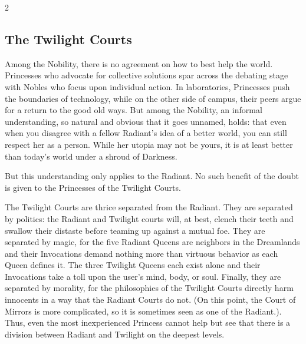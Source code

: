 \begin{multicols}{2}

\subsection*{The Twilight Courts}

Among the Nobility, there is no agreement on how to best help the world. Princesses who advocate for collective solutions spar across the debating stage with Nobles who focus upon individual action. In laboratories, Princesses push the boundaries of technology, while on the other side of campus, their peers argue for a return to the good old ways. But among the Nobility, an informal understanding, so natural and obvious that it goes unnamed, holds: that even when you disagree with a fellow Radiant's idea of a better world, you can still respect her as a person. While her utopia may not be yours, it is at least better than today's world under a shroud of Darkness. 

But this understanding only applies to the Radiant. No such benefit of the doubt is given to the Princesses of the Twilight Courts. 

The Twilight Courts are thrice separated from the Radiant. They are separated by politics: the Radiant and Twilight courts will, at best, clench their teeth and swallow their distaste before teaming up against a mutual foe. They are separated by magic, for the five Radiant Queens are neighbors in the Dreamlands and their Invocations demand nothing more than virtuous behavior as each Queen defines it. The three Twilight Queens each exist alone and their Invocations take a toll upon the user's mind, body, or soul. Finally, they are separated by morality, for the philosophies of the Twilight Courts directly harm innocents in a way that the Radiant Courts do not. (On this point, the Court of Mirrors is more complicated, so it is sometimes seen as one of the Radiant.). Thus, even the most inexperienced Princess cannot help but see that there is a division between Radiant and Twilight on the deepest levels.


\end{multicols}
